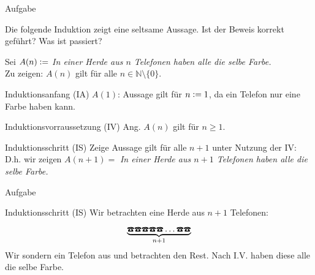 %
%
%
%

{
	\begin{frame}[fragile]{Aufgabe}
		\begin{alertblock}{Die folgende Induktion zeigt eine seltsame Aussage.}
			Ist der Beweis korrekt geführt? Was ist passiert?
		\end{alertblock}
		Sei $A(n)\vcentcolon=$ \emph{In einer Herde aus $n$ Telefonen haben alle die selbe Farbe.}\\
		Zu zeigen: $A(n)$ gilt für alle $n \in \mathbb{N} \setminus \{0\} $.
		\begin{alertblock}{Induktionsanfang (IA)}
			$A(1)$: Aussage gilt für $n\vcentcolon= 1$, da ein Telefon nur eine Farbe haben kann.
		\end{alertblock}
		\begin{alertblock}{Induktionsvorraussetzung (IV)}
			Ang. $A(n)$ gilt für $n\geq1$.
		\end{alertblock}
		\begin{alertblock}{Induktionsschritt (IS)}
			Zeige Aussage gilt für alle $n+1$ unter Nutzung der IV:\\
			D.h. wir zeigen $A(n+1)=$ \emph{In einer Herde aus $n+1$ Telefonen haben alle die selbe Farbe.}
		\end{alertblock}
	\end{frame}
	\begin{frame}[fragile]{Aufgabe}
		\footnotesize{
			\begin{alertblock}{Induktionsschritt (IS)}
				Wir betrachten eine Herde aus $n+1$ Telefonen:
				\[\underbrace{\text{\Telefon}\text{\Telefon}\text{\Telefon}\text{\Telefon}\text{\Telefon}\dots\text{\Telefon}\text{\Telefon}}_{n+1}\]
				Wir sondern ein Telefon aus und betrachten den Rest. Nach I.V. haben diese alle die selbe Farbe.

\end{alertblock}}
\end{frame}}
